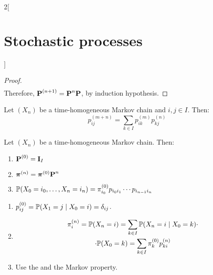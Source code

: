 \documentclass[../../../main_math.tex]{subfiles}
\begin{document}
\begin{multicols}{2}[\section{Stochastic processes}]
\begin{proof}
\begin{multline*}
    \end{multline*}
    Therefore, $\boldsymbol{\mathrm{P}}^{(n+1)}=\boldsymbol{\mathrm{P}}^n\boldsymbol{\mathrm{P}}$, by induction hypothesis.
  \end{proof}
  \begin{theorem}\label{SP:ChapKolmo}
    Let $(X_n)$ be a time-homogeneous Markov chain and $i,j\in I$. Then:
    $$p_{ij}^{(m+n)}=\sum_{k\in I}p_{ik}^{(m)}p_{kj}^{(n)}$$
  \end{theorem}
  \begin{proposition}
    Let $(X_n)$ be a time-homogeneous Markov chain. Then:
    \begin{enumerate}
      \item $\boldsymbol{\mathrm{P}}^{(0)}=\boldsymbol{\mathrm{I}}_I$
      \item $\boldsymbol{\mathrm{\pi}}^{(n)}=\boldsymbol{\mathrm{\pi}}^{(0)}\boldsymbol{\mathrm{P}}^n$
      \item $\mathbb{P}(X_0=i_0,\ldots,X_n=i_n)=\pi_{i_0}^{(0)}p_{i_0i_1}\cdots p_{i_{n-1}i_n}$
    \end{enumerate}
  \end{proposition}
  \begin{sproof}
    \begin{enumerate}
      \item $p_{ij}^{(0)}=\mathbb{P}(X_1=j\mid X_0=i)=\delta_{ij}$.
      \item
            \begin{multline*}
              \pi_i^{(n)}=\mathbb{P}(X_n=i)=\sum_{k\in I}\mathbb{P}(X_n=i\mid X_0=k)\cdot\\\cdot\mathbb{P}(X_0=k)=\sum_{k\in I}\pi_k^{(0)}p_{ki}^{(n)}
            \end{multline*}
      \item Use the  and the Markov property.
    \end{enumerate}
  \end{sproof}

\end{multicols}
\end{document}
